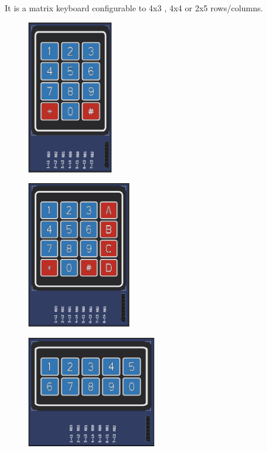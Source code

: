 It is a matrix keyboard configurable to 4x3 , 4x4 or 2x5 rows/columns.

\begin{figure}[H]
\center
\includegraphics[width=0.33\textwidth]{img/part_keyb_4x3.png} 
\end{figure} 

\begin{figure}[H]
\center
\includegraphics[width=0.4\textwidth]{img/part_keyb_4x4.png} 
\end{figure} 

\begin{figure}[H]
\center
\includegraphics[width=0.5\textwidth]{img/part_keyb_2x5.png} 
\end{figure} 

